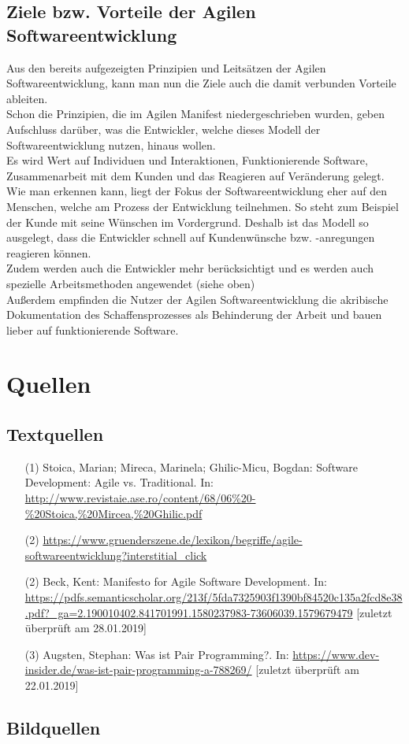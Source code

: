 \documentclass[a4paper, 10pt]{scrartcl}
\begin{document}
\subsection{Ziele bzw. Vorteile der Agilen Softwareentwicklung}
Aus den bereits aufgezeigten Prinzipien und Leitsätzen der Agilen Softwareentwicklung, kann man nun die Ziele  auch die damit verbunden Vorteile ableiten. \\
Schon die Prinzipien, die im \glqq{}Agilen Manifest\grqq{} niedergeschrieben wurden, geben Aufschluss darüber, was die Entwickler, welche dieses Modell der Softwareentwicklung nutzen, hinaus wollen.\\ Es wird Wert auf \glqq{}Individuen und Interaktionen, Funktionierende Software, Zusammenarbeit mit dem Kunden und das Reagieren auf Veränderung\grqq{} gelegt. Wie man erkennen kann, liegt der Fokus der Softwareentwicklung eher auf den Menschen, welche am Prozess der Entwicklung teilnehmen. So steht zum Beispiel der Kunde mit seine Wünschen im Vordergrund. Deshalb ist das Modell so ausgelegt, dass die Entwickler schnell auf Kundenwünsche bzw. -anregungen reagieren können.\\ Zudem werden auch die Entwickler mehr berücksichtigt und es werden auch spezielle Arbeitsmethoden angewendet (siehe oben)\\Außerdem empfinden die Nutzer der Agilen Softwareentwicklung die akribische Dokumentation des Schaffensprozesses als Behinderung der Arbeit und bauen lieber auf \glqq funktionierende Software\grqq. \\ 


\section{Quellen}
\subsection{Textquellen}
\begin{itemize}
\item[(1)] Stoica, Marian; Mireca, Marinela; Ghilic-Micu, Bogdan: Software Development: Agile vs. Traditional. In: \url{http://www.revistaie.ase.ro/content/68/06%20-%20Stoica,%20Mircea,%20Ghilic.pdf}
\item[(2)] \url{https://www.gruenderszene.de/lexikon/begriffe/agile-softwareentwicklung?interstitial_click}
\item[(2)] Beck, Kent: Manifesto for Agile Software Development. In: \url{https://pdfs.semanticscholar.org/213f/5fda7325903f1390bf84520c135a2fcd8e38.pdf?_ga=2.190010402.841701991.1580237983-73606039.1579679479} [zuletzt überprüft am 28.01.2019]
\item[(3)] Augsten, Stephan: Was ist Pair Programming?. In: \url{https://www.dev-insider.de/was-ist-pair-programming-a-788269/} [zuletzt überprüft am 22.01.2019]
\end{itemize}
\subsection{Bildquellen}
\end{document}
